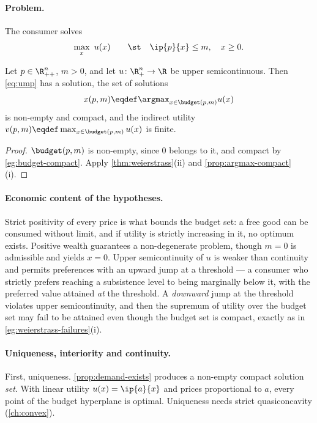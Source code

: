 \paragraph{Problem.} The consumer solves
\begin{equation}\label{eq:ump}
	\max_{x}\ u(x)
	\qquad\st\quad \ip{p}{x}\leq m,\quad x\geq0 .
\end{equation}

\begin{proposition}
	\label{prop:demand-exists}
	Let $p\in\R^n_{++}$, $m>0$, and let $u\colon\R^n_+\to\R$ be upper
	semicontinuous. Then \eqref{eq:ump} has a solution, the set of solutions
	\[
		x(p,m)\eqdef\argmax_{x\in\budget(p,m)}u(x)
	\]
	is non-empty and compact, and the indirect utility
	$v(p,m)\eqdef\max_{x\in\budget(p,m)}u(x)$ is finite.
\end{proposition}

\begin{proof}
	$\budget(p,m)$ is non-empty, since $0$ belongs to it, and compact by
	\autoref{eg:budget-compact}. Apply \autoref{thm:weierstrass}(ii) and
	\autoref{prop:argmax-compact}(i).
\end{proof}

\paragraph{Economic content of the hypotheses.} Strict positivity of every
price is what bounds the budget set: a free good can be consumed without limit,
and if utility is strictly increasing in it, no optimum exists. Positive wealth
guarantees a non-degenerate problem, though $m=0$ is admissible and yields
$x=0$. Upper semicontinuity of $u$ is weaker than continuity and permits
preferences with an upward jump at a threshold --- a consumer who strictly
prefers reaching a subsistence level to being marginally below it, with the
preferred value attained \emph{at} the threshold. A \emph{downward} jump at the
threshold violates upper semicontinuity, and then the supremum of utility over
the budget set may fail to be attained even though the budget set is compact,
exactly as in \autoref{eg:weierstrass-failures}(i).

\paragraph{Uniqueness, interiority and continuity.}

First, uniqueness. \autoref{prop:demand-exists} produces a non-empty compact
solution \emph{set}. With linear utility $u(x)=\ip{a}{x}$ and prices
proportional to $a$, every point of the budget hyperplane is optimal.
Uniqueness needs strict quasiconcavity (\autoref{ch:convex}).

